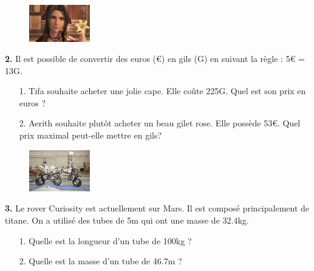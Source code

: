 \begin{minipage}[t]{0.25\textwidth}
  \begin{figure}[H]
    \centering
    \includegraphics[width=100px]{4x2-proportionnalite/ex2.jpg}
  \end{figure}
\end{minipage}
\begin{minipage}[t]{0.75\textwidth}
\textbf{2.} Il est possible de convertir des euros (€) en gils (G) en suivant la règle : 5€ = 13G.

\begin{enumerate}
  \item[1.] Tifa souhaite acheter une jolie cape. Elle coûte 225G. Quel est son prix en euros ? 
  \item[2.] Aerith souhaite plutôt acheter un beau gilet rose. Elle possède 53€. Quel prix maximal peut-elle mettre en gils?
\end{enumerate}

\Pointilles[1]
\end{minipage}

\Pointilles[7]

\begin{minipage}[t]{0.25\textwidth}
  \begin{figure}[H]
    \centering
    \includegraphics[width=100px]{4x2-proportionnalite/ex3.jpg}
  \end{figure}
\end{minipage}
\begin{minipage}[t]{0.75\textwidth}
\textbf{3.} Le rover Curiosity est actuellement sur Mars. Il est composé principalement de titane. On a utilisé des tubes de 5m qui ont une masse de 32.4kg. 

\begin{enumerate}
  \item[1.] Quelle est la longueur d'un tube de 100kg ?
  \item[2.] Quelle est la masse d'un tube de 46.7m ? 
\end{enumerate}

\Pointilles[3]
\end{minipage}

